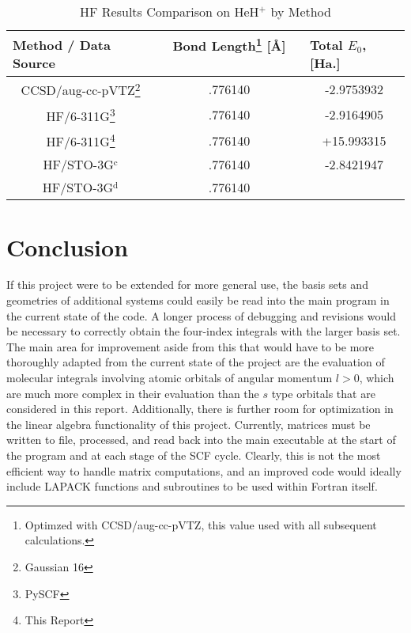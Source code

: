 \documentclass[%
 aip,
 amsmath,amssymb,
 reprint,%
]{revtex4-1}
\begin{document}
\begin{table}[]
\caption{HF Results Comparison on HeH$^{+}$ by Method}
\label{tab:hf_results}
\begin{ruledtabular}
\begin{tabular}{|c|c|c|}
\hline
\multicolumn{1}{|l|}{\textbf{Method / Data Source}} &
\multicolumn{1}{c|}{\textbf{Bond Length\footnote{Optimzed with
CCSD/aug-cc-pVTZ, this value used with all subsequent calculations.} [Å] \ \ \ \ }} 
& \multicolumn{1}{l|}{\textbf{Total $E_0$, [Ha.]}} \\ \hline
CCSD/aug-cc-pVTZ\footnote{Gaussian 16}      & .776140  & -2.9753932    \\ \hline 
HF/6-311G\footnote{PySCF}     & .776140     & -2.9164905    \\ \hline
HF/6-311G\footnote{This Report}  & .776140  &  +15.993315        \\ \hline
HF/STO-3G$^{\text{c}}$ & .776140 & -2.8421947 \\ \hline
HF/STO-3G$^{\text{d}}$ & .776140 & \\ \hline
\end{tabular}
\end{ruledtabular}
\end{table}


\section{Conclusion}
If this project were to be extended for more general use, the basis sets and
geometries of additional systems could easily be read into the main program in
the current state of the code. A longer process of debugging and revisions
would be necessary to correctly obtain the four-index integrals with the
larger basis set. The main area
for improvement aside from this that would have to be more thoroughly adapted
from the current state of the project are the evaluation of molecular
integrals involving atomic orbitals of angular momentum $l > 0$, which are
much more complex in their evaluation than the $s$ type orbitals that are
considered in this report. Additionally, there is further room for
optimization in the linear algebra functionality of this project. Currently,
matrices must be written to file, processed, and read back into the main
executable at the start of the program and at each stage of the SCF cycle.
Clearly, this is not the most efficient way to handle matrix computations, and
an improved code would ideally include LAPACK functions and subroutines to be
used within Fortran itself.


\end{document}
